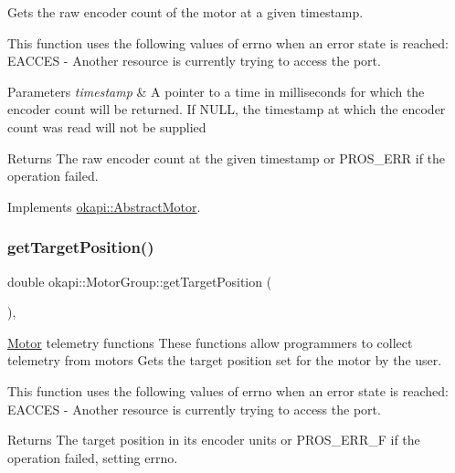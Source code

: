 Gets the raw encoder count of the motor at a given timestamp.

This function uses the following values of errno when an error state is reached\+: E\+A\+C\+C\+ES -\/ Another resource is currently trying to access the port.


\begin{DoxyParams}{Parameters}
{\em timestamp} & A pointer to a time in milliseconds for which the encoder count will be returned. If N\+U\+LL, the timestamp at which the encoder count was read will not be supplied\\
\hline
\end{DoxyParams}
\begin{DoxyReturn}{Returns}
The raw encoder count at the given timestamp or P\+R\+O\+S\+\_\+\+E\+RR if the operation failed. 
\end{DoxyReturn}


Implements \mbox{\hyperlink{classokapi_1_1AbstractMotor_aa34fefa954fbff26e3d68e59c4f10964}{okapi\+::\+Abstract\+Motor}}.

\mbox{\label{classokapi_1_1MotorGroup_ad6332111f8b2642bc13fbd8822328121}} 
\subsubsection{\texorpdfstring{getTargetPosition()}{getTargetPosition()}}
{\footnotesize\ttfamily double okapi\+::\+Motor\+Group\+::get\+Target\+Position (\begin{DoxyParamCaption}{ }\end{DoxyParamCaption})\hspace{0.3cm}{\ttfamily [override]}, {\ttfamily [virtual]}}

\mbox{\hyperlink{classokapi_1_1Motor}{Motor}} telemetry functions These functions allow programmers to collect telemetry from motors Gets the target position set for the motor by the user.

This function uses the following values of errno when an error state is reached\+: E\+A\+C\+C\+ES -\/ Another resource is currently trying to access the port.

\begin{DoxyReturn}{Returns}
The target position in its encoder units or P\+R\+O\+S\+\_\+\+E\+R\+R\+\_\+F if the operation failed, setting errno. 
\end{DoxyReturn}


